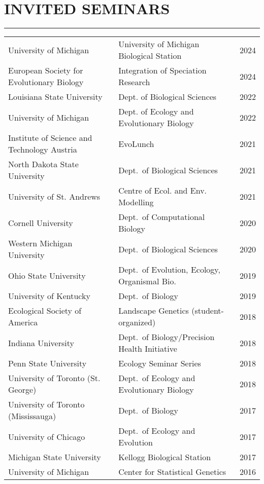 \documentclass{gbcv}
\begin{document}
\section*{INVITED SEMINARS}
\vspace{-0.6cm}
\rule{470pt}{0.4pt}
%
\begin{longtable}{>{\everypar{\hangindent1cm}}p{}p{}p{}}
%
University of Michigan & University of Michigan Biological Station & \hfill 2024\\
%
European Society for Evolutionary Biology & Integration of Speciation Research & \hfill 2024\\
%
Louisiana State University & Dept. of Biological Sciences & \hfill 2022 \\
%
University of Michigan & Dept. of Ecology and Evolutionary Biology & \hfill 2022 \\
%
Institute of Science and Technology Austria & EvoLunch & \hfill 2021 \\
%
North Dakota State University & Dept.\ of Biological Sciences & \hfill 2021 \\
%
University of St. Andrews & Centre of Ecol. and Env. Modelling & \hfill 2021 \\
%
Cornell University & Dept.\ of Computational Biology & \hfill 2020 \\
%
Western Michigan University & Dept.\ of Biological Sciences & \hfill 2020 \\
%
Ohio State University & Dept.\ of Evolution, Ecology, Organismal Bio. & \hfill 2019 \\
%
University of Kentucky & Dept.\ of Biology & \hfill 2019 \\
%
Ecological Society of America & Landscape Genetics (student-organized) & \hfill 2018 \\
%
Indiana University & Dept.\ of Biology/Precision Health Initiative & \hfill 2018 \\
%
Penn State University & Ecology Seminar Series & \hfill 2018 \\
%
University of Toronto (St. George) & Dept.\ of Ecology and Evolutionary Biology & \hfill 2018 \\
%
University of Toronto (Mississauga) & Dept.\ of Biology & \hfill 2017 \\
%
University of Chicago & Dept.\ of Ecology and Evolution & \hfill 2017 \\
%
Michigan State University & Kellogg Biological Station & \hfill 2017 \\
%
University of Michigan & Center for Statistical Genetics & \hfill 2016 \\

\end{longtable}
\end{document}
